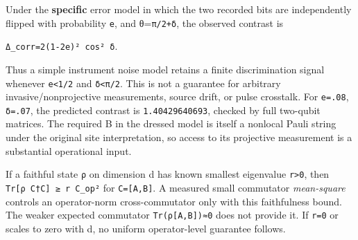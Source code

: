 \documentclass[
  10pt,
  a4paper,
]{article}
\begin{document}
Under the \textbf{specific} error model in which the two recorded bits are independently flipped with probability \texttt{e}, and θ=\texttt{π/2+δ}, the observed contrast is

\texttt{Δ\_corr=2(1-2e)²\ cos²\ δ}.

Thus a simple instrument noise model retains a finite discrimination signal whenever \texttt{e\textless{}1/2} and \texttt{\textbar{}δ\textbar{}\textless{}π/2}. This is not a guarantee for arbitrary invasive/nonprojective measurements, source drift, or pulse crosstalk. For \texttt{e=.08}, \texttt{δ=.07}, the predicted contrast is \texttt{1.40429640693}, checked by full two-qubit matrices. The required B in the dressed model is itself a nonlocal Pauli string under the original site interpretation, so access to its projective measurement is a substantial operational input.

If a faithful state \texttt{ρ} on dimension d has known smallest eigenvalue \texttt{r\textgreater{}0}, then \texttt{Tr{[}ρ\ C†C{]}\ ≥\ r\ \textbar{}\textbar{}C\textbar{}\textbar{}\_op²} for \texttt{C={[}A,B{]}}. A measured small commutator \emph{mean-square} controls an operator-norm cross-commutator only with this faithfulness bound. The weaker expected commutator \texttt{Tr(ρ{[}A,B{]})≈0} does not provide it. If \texttt{r=0} or scales to zero with d, no uniform operator-level guarantee follows.
\end{document}
